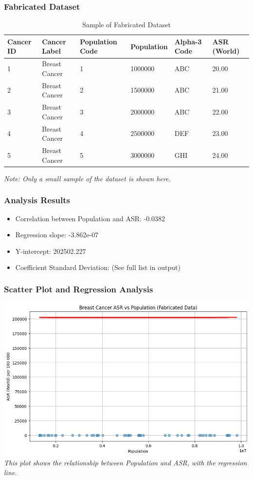 \begin{frame}
  \frametitle{Fabricated Dataset}
  \begin{table}
    \centering
    \begin{tabular}{p{1.2cm} p{1.8cm} p{1.5cm} p{1.5cm} p{1.5cm} p{1.2cm}}
      \toprule
      Cancer ID & Cancer Label & Population Code & Population & Alpha-3 Code & ASR (World) \\
      \midrule
      1 & Breast Cancer & 1 & 1000000 & ABC & 20.00 \\
      2 & Breast Cancer & 2 & 1500000 & ABC & 21.00 \\
      3 & Breast Cancer & 3 & 2000000 & ABC & 22.00 \\
      4 & Breast Cancer & 4 & 2500000 & DEF & 23.00 \\
      5 & Breast Cancer & 5 & 3000000 & GHI & 24.00 \\
      \bottomrule
    \end{tabular}
    \caption{Sample of Fabricated Dataset}
    \label{tab:fabricated_data}
  \end{table}
  \textit{Note: Only a small sample of the dataset is shown here.}
\end{frame}

\begin{frame}
  \frametitle{Analysis Results}
  \begin{itemize}
    \item Correlation between Population and ASR: -0.0382
    \item Regression slope: -3.862e-07
    \item Y-intercept: 202502.227
    \item Coefficient Standard Deviation: (See full list in output)
  \end{itemize}
\end{frame}

\begin{frame}
  \frametitle{Scatter Plot and Regression Analysis}
  \includegraphics[width=\textwidth]{./images/analysis.png}
  \textit{This plot shows the relationship between Population and ASR, with the regression line.}
\end{frame}